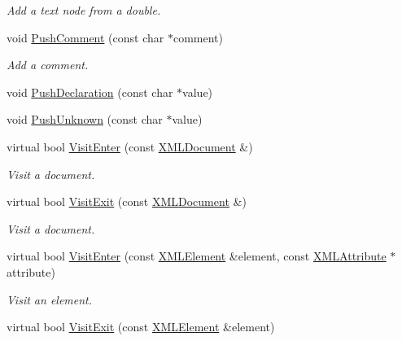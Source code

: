 \begin{DoxyCompactItemize}
\begin{DoxyCompactList}\small\item\em Add a text node from a double. \end{DoxyCompactList}\item 
void \mbox{\hyperlink{classtinyxml2_1_1_x_m_l_printer_afc8416814219591c2fd5656e0c233140}{Push\+Comment}} (const char $\ast$comment)
\begin{DoxyCompactList}\small\item\em Add a comment. \end{DoxyCompactList}\item 
void \mbox{\hyperlink{classtinyxml2_1_1_x_m_l_printer_a2fe3565e262594efc6c0276723c83fe7}{Push\+Declaration}} (const char $\ast$value)
\item 
void \mbox{\hyperlink{classtinyxml2_1_1_x_m_l_printer_ab1efc6d1548505e9984185f58f54b713}{Push\+Unknown}} (const char $\ast$value)
\item 
virtual bool \mbox{\hyperlink{classtinyxml2_1_1_x_m_l_printer_a9aa1de11a55a07db55a90fde37d7afad}{Visit\+Enter}} (const \mbox{\hyperlink{classtinyxml2_1_1_x_m_l_document}{X\+M\+L\+Document}} \&)
\begin{DoxyCompactList}\small\item\em Visit a document. \end{DoxyCompactList}\item 
virtual bool \mbox{\hyperlink{classtinyxml2_1_1_x_m_l_printer_a15fc1f2b922f540917dcf52808737b29}{Visit\+Exit}} (const \mbox{\hyperlink{classtinyxml2_1_1_x_m_l_document}{X\+M\+L\+Document}} \&)
\begin{DoxyCompactList}\small\item\em Visit a document. \end{DoxyCompactList}\item 
virtual bool \mbox{\hyperlink{classtinyxml2_1_1_x_m_l_printer_a169b2509d8eabb70811b2bb8cfd1f5d1}{Visit\+Enter}} (const \mbox{\hyperlink{classtinyxml2_1_1_x_m_l_element}{X\+M\+L\+Element}} \&element, const \mbox{\hyperlink{classtinyxml2_1_1_x_m_l_attribute}{X\+M\+L\+Attribute}} $\ast$attribute)
\begin{DoxyCompactList}\small\item\em Visit an element. \end{DoxyCompactList}\item 
virtual bool \mbox{\hyperlink{classtinyxml2_1_1_x_m_l_printer_a2edd48405971a88951c71c9df86a2f50}{Visit\+Exit}} (const \mbox{\hyperlink{classtinyxml2_1_1_x_m_l_element}{X\+M\+L\+Element}} \&element)

\end{DoxyCompactItemize}
